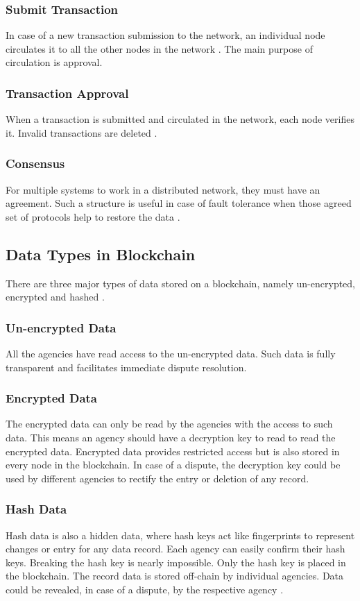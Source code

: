 \documentclass[sigconf]{acmart}
\begin{document}
\subsubsection{Submit Transaction} In case of a new transaction submission to the network, an individual node circulates it to all the other nodes in the network \cite{pabc1}. The main purpose of circulation is approval. 

\subsubsection{Transaction Approval} When a transaction is submitted and circulated in the network, each node verifies it. Invalid transactions are deleted \cite{pabc1}.

\subsubsection{Consensus} For multiple systems to work in a distributed network, they must have an agreement. Such a structure is useful in case of fault tolerance when those agreed set of protocols help to restore the data \cite{pabc1}.

\subsection{Data Types in Blockchain}
There are three major types of data stored on a blockchain, namely un-encrypted, encrypted and hashed \cite{arbc1}. 

\subsubsection{Un-encrypted Data} All the agencies have read access to the un-encrypted data. Such data is fully transparent and facilitates immediate dispute resolution.

\subsubsection{Encrypted Data} The encrypted data can only be read by the agencies with the access to such data. This means an agency should have a decryption key to read to read the encrypted data. Encrypted data provides restricted access but is also stored in every node in the blockchain. In case of a dispute, the decryption key could be used by different agencies to rectify the entry or deletion of any record.

\subsubsection{Hash Data} Hash data is also a hidden data, where hash keys act like fingerprints to represent changes or entry for any data record. Each agency can easily confirm their hash keys. Breaking the hash key is nearly impossible. Only the hash key is placed in the blockchain. The record data is stored off-chain by individual agencies. Data could be revealed, in case of a dispute, by the respective agency \cite{arbc1}.
\end{document}
